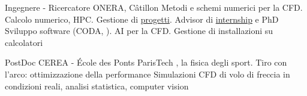 \documentclass[italian]{RMcv}
\begin{document}






%
%


%
        {Ingegnere - Ricercatore}%
        {ONERA, C\^{a}tillon}%
        {Metodi e schemi numerici per la CFD. Calcolo numerico, HPC. Gestione di \href{\NextSimlink}{progetti}. Advisor di \href{\articleJeanlink}{internship} e PhD}%
        {Sviluppo software (CODA, \CoMMAhref). AI per la CFD. Gestione di installazioni su calcolatori}

%
%
        {PostDoc}%
        {CEREA - \'Ecole des Ponts ParisTech}%
        {\SciencesJOhref{}, la fisica degli sport. Tiro con l'arco: ottimizzazione della performance}%
        {Simulazioni CFD di volo di freccia in condizioni reali, analisi statistica, computer vision}
\end{document}
